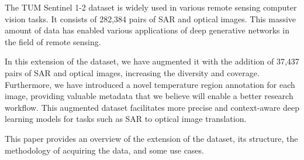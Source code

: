 The TUM Sentinel 1-2 dataset\cite{tumsen12} is widely used in various remote sensing computer vision tasks. It consists of 282,384 pairs of SAR and optical images. This massive amount of data has enabled various applications of deep generative networks in the field of remote sensing\cite{Zhang2023}.

In this extension of the dataset, we have augmented it with the addition of 37,437 pairs of SAR and optical images, increasing the diversity and coverage. Furthermore, we have introduced a novel temperature region annotation for each image, providing valuable metadata that we believe will enable a better research workflow. This augmented dataset facilitates more precise and context-aware deep learning models for tasks such as SAR to optical image translation.

This paper provides an overview of the extension of the dataset, its structure, the methodology of acquiring the data, and some use cases.